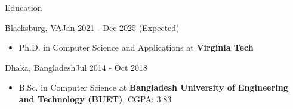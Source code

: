 \documentclass[]{mcdowellcv}
\begin{document}
	\makeheader
	
	\begin{cvsection}{Education}
		\begin{cvsubsection}{Blacksburg, VA}{}{Jan 2021 - Dec 2025 (Expected)}
			\begin{itemize}
				\item Ph.D. in Computer Science and Applications at \textbf{Virginia Tech}%
			\end{itemize}
		\end{cvsubsection}
		\begin{cvsubsection}{Dhaka, Bangladesh}{}{Jul 2014 - Oct 2018}
			\begin{itemize}
				\item B.Sc. in Computer Science at \textbf{Bangladesh University of Engineering and Technology (BUET)}, CGPA: 3.83
			\end{itemize}
		\end{cvsubsection}
	\end{cvsection}
\end{document}
